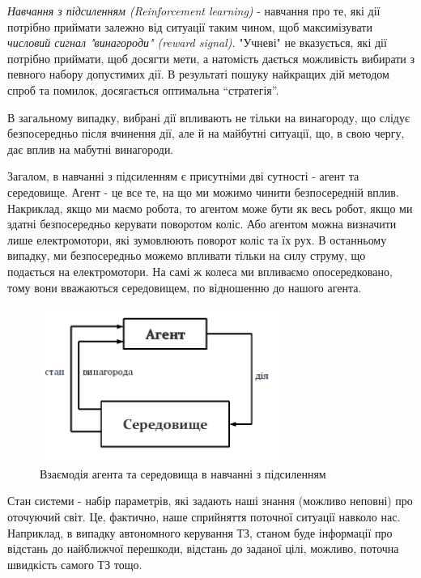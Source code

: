 \emph{Навчання з підсиленням (Reinforcement learning)} - навчання про те, які дії потрібно приймати залежно від ситуації таким чином, щоб максимізувати \emph{числовий сигнал "винагороди" (reward signal)}. "Учневі" не вказується, які дії потрібно приймати, щоб досягти мети, а натомість дається можливість вибирати з певного набору допустимих дії. В результаті пошуку найкращих дій методом спроб та помилок, досягається оптимальна ``стратегія''.

В загальному випадку, вибрані дії впливають не тільки на винагороду, що слідує безпосередньо після вчинення дії, але й на майбутні ситуації, що, в свою чергу, дає вплив на мабутні винагороди.

Загалом, в навчанні з підсиленням є присутніми дві сутності - агент та середовище. Агент - це все те, на що ми можимо чинити безпосередній вплив. Накриклад, якщо ми маємо робота, то агентом може бути як весь робот, якщо ми здатні безпосередньо керувати поворотом коліс. Або агентом можна визначити лише електромотори, які зумовлюють поворот коліс та їх рух. В останньому випадку, ми безпосередньо можемо впливати тільки на силу струму, що подається на електромотори. На самі ж колеса ми впливаємо опосередковано, тому вони вважаються середовищем, по відношенню до нашого агента.

\begin{figure}[!h]\begin{center}
\includegraphics[width=0.7\textwidth]{agent_env_diagram.png}
\caption{Взаємодія агента та середовища в навчанні з підсиленням}
\end{center}\end{figure}

Стан системи - набір параметрів, які задають наші знання (можливо неповні) про оточуючий світ. Це, фактично, наше сприйняття поточної ситуації навколо нас. Наприклад, в випадку автономного керування ТЗ, станом буде інформації про відстань до найближчої перешкоди, відстань до заданої цілі, можливо, поточна швидкість самого ТЗ тощо.

